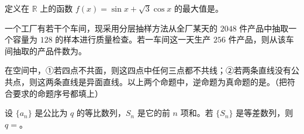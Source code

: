 \begin{question}
定义在 $\mathbb R$ 上的函数 $f(x)=\sin x+\sqrt3\cos x$ 的最大值是\gkblank{}。

\end{question}
\begin{question}
一个工厂有若干个车间，现采用分层抽样方法从全厂某天的 $2048$ 件产品中抽取一个容量为 $128$ 的样本进行质量检查。若一车间这一天生产 $256$ 件产品，则从该车间抽取的产品件数为\gkblank{}。

\end{question}
\begin{question}
在空间中，①若四点不共面，则这四点中任何三点都不共线；②若两条直线没有公共点，则这两条直线是异面直线。以上两个命题中，逆命题为真命题的是\gkblank{}。（把符合要求的命题序号都填上）

\end{question}
\begin{question}
设 $\{a_n\}$ 是公比为 $q$ 的等比数列，$S_n$ 是它的前 $n$ 项和。若 $\{S_n\}$ 是等差数列，则 $q=$\gkblank{}。

\end{question}

